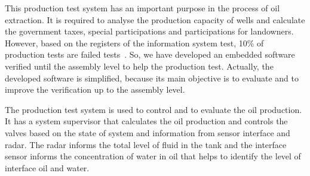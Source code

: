 This production test system has an important purpose in the process of oil
extraction. It is required to analyse the production capacity of wells and
calculate the government taxes, special participations and participations for
landowners. However, based on the registers of the information system test,
10\% of production tests are failed tests~\cite{LAUT_SERGIO}. So, we have developed an embedded
software verified until the assembly level to help the production test. Actually,
the developed software is simplified, because its main objective is to evaluate
and to improve the verification up to the assembly level.





The production test system is used to control and to evaluate the oil production.
It has a system supervisor that calculates the oil production and controls the
valves based on the state of system and information from sensor interface and
radar. The radar informs the total level of fluid in the tank and the interface sensor
informs the concentration of water in oil that helps to identify the level of
interface oil and water.




